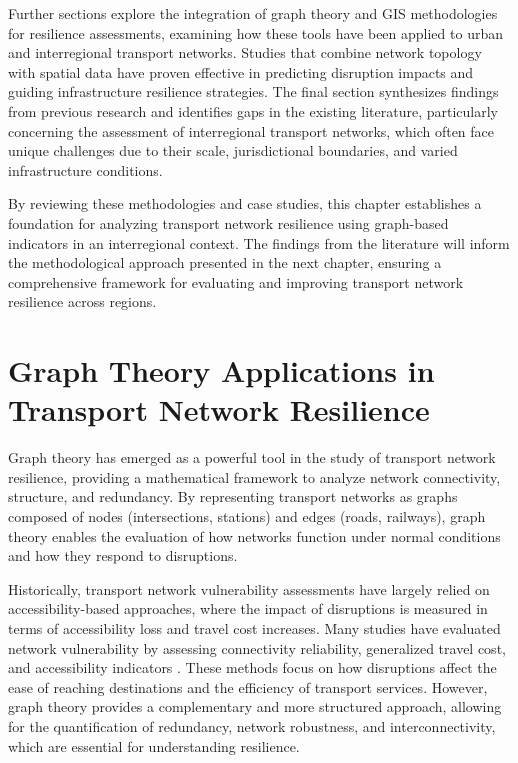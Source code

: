 Further sections explore the integration of graph theory and GIS methodologies for resilience assessments, examining how these tools have been applied to urban and interregional transport networks. Studies that combine network topology with spatial data have proven effective in predicting disruption impacts and guiding infrastructure resilience strategies. The final section synthesizes findings from previous research and identifies gaps in the existing literature, particularly concerning the assessment of interregional transport networks, which often face unique challenges due to their scale, jurisdictional boundaries, and varied infrastructure conditions.

By reviewing these methodologies and case studies, this chapter establishes a foundation for analyzing transport network resilience using graph-based indicators in an interregional context. The findings from the literature will inform the methodological approach presented in the next chapter, ensuring a comprehensive framework for evaluating and improving transport network resilience across regions.

\section{Graph Theory Applications in Transport Network Resilience}
Graph theory has emerged as a powerful tool in the study of transport network resilience, providing a mathematical framework to analyze network connectivity, structure, and redundancy. By representing transport networks as graphs composed of nodes (intersections, stations) and edges (roads, railways), graph theory enables the evaluation of how networks function under normal conditions and how they respond to disruptions.

Historically, transport network vulnerability assessments have largely relied on accessibility-based approaches, where the impact of disruptions is measured in terms of accessibility loss and travel cost increases. Many studies have evaluated network vulnerability by assessing connectivity reliability, generalized travel cost, and accessibility indicators \cite{taylor2006, jenelius2006}. These methods focus on how disruptions affect the ease of reaching destinations and the efficiency of transport services. However, graph theory provides a complementary and more structured approach, allowing for the quantification of redundancy, network robustness, and interconnectivity, which are essential for understanding resilience.

